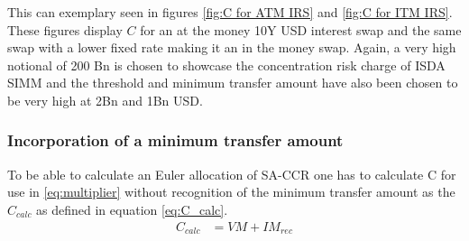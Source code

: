 \documentclass[../Thesis_AHoecherl.tex]{subfiles}
\begin{document}
    This can exemplary seen in figures \ref{fig:C for ATM IRS} and \ref{fig:C for ITM IRS}. These figures display $C$ for an at the money 10Y USD interest swap and the same swap with a lower fixed rate making it an in the money swap. Again, a very high notional of 200 Bn is chosen to showcase the concentration risk charge of ISDA SIMM and the threshold and minimum transfer amount have also been chosen to be very high at 2Bn and 1Bn USD.

    \subsubsection{Incorporation of a minimum transfer amount}

     To be able to calculate an Euler allocation of SA-CCR one has to calculate C for use in \ref{eq:multiplier} without recognition of the minimum transfer amount as the $C_{calc}$ as defined in equation \ref{eq:C_calc}.
    \begin{align}
        \label{eq:C_calc}
        C_{calc} &= VM + IM_{rec}
    \end{align}
    
\end{document}
